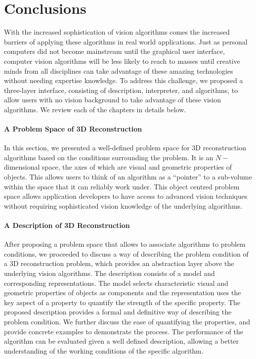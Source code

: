 
\chapter{Conclusions}
\label{ch:conclusion}
With the increased sophistication of vision algorithms comes the increased barriers of applying these algorithms in real world applications. Just as personal computers did not become mainstream until the graphical user interface, computer vision algorithms will be less likely to reach to masses until creative minds from all disciplines can take advantage of these amazing technologies without needing expertise knowledge. To address this challenge, we proposed a three-layer interface, consisting of description, interpreter, and algorithms, to allow users with no vision background to take advantage of these vision algorithms. We review each of the chapters in details below.

\subsubsection{A Problem Space of 3D Reconstruction}
In this section, we presented a well-defined problem space for 3D reconstruction algorithms based on the conditions surrounding the problem. It is an $N-$dimensional space, the axes of which are visual and geometric properties of objects. This allows users to think of an algorithm as a ``pointer'' to a sub-volume within the space that it can reliably work under. This object centred problem space allows application developers to have access to advanced vision techniques without requiring sophisticated vision knowledge of the underlying algorithms.

\subsubsection{A Description of 3D Reconstruction}
After proposing a problem space that allows to associate algorithms to problem conditions, we proceeded to discuss a way of describing the problem condition of a 3D reconstruction problem, which provides an abstraction layer above the underlying vision algorithms. The description consists of a model and corresponding representations. The model selects characteristic visual and geometric properties of objects as components and the representation uses the key aspect of a property to quantify the strength of the specific property. The proposed description provides a formal and definitive way of describing the problem condition. We further discuss the ease of quantifying the properties, and provide concrete examples to demonstrate the process. The performance of the algorithm can be evaluated given a well defined description, allowing a better understanding of the working conditions of the specific algorithm.

